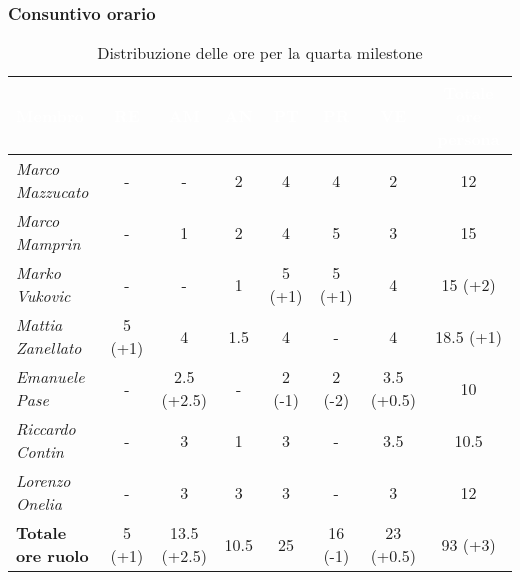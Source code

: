 \subsubsection{Consuntivo orario}
\begin{table}[H]
    \renewcommand\arraystretch{1.5}
    \small
    \centering
    \begin{adjustwidth}{-1.15cm}{}
    \begin{tabular}{|l|c|c|c|c|c|c|c|}
    \hline
    \rowcolor[HTML]{036400}
    \textcolor{white}{\textbf{Membro}} & \multicolumn{1}{c|}{\textcolor{white}{\textbf{RE}}} & \multicolumn{1}{c|}{\textcolor{white}{\textbf{AM}}} & \multicolumn{1}{c|}{\textcolor{white}{\textbf{AN}}} & \multicolumn{1}{c|}{\textcolor{white}{\textbf{PT}}} & \multicolumn{1}{c|}{\textcolor{white}{\textbf{PR}}} & \multicolumn{1}{c|}{\textcolor{white}{\textbf{VE}}} & \multicolumn{1}{c|}{\textcolor{white}{\textbf{Totale ore persona}}} \\ \hline
    \rowcolor[HTML]{EFEFEF}\textit{Marco Mazzucato}  & -       & -           & 2           & 4           & 4       & 2            & 12           \\ \hline
    \rowcolor[HTML]{C0C0C0}\textit{Marco Mamprin}    & -       & 1           & 2           & 4           & 5       & 3            & 15           \\ \hline
    \rowcolor[HTML]{EFEFEF}\textit{Marko Vukovic}    & -       & -           & 1           & 5 (+1)      & 5 (+1)  & 4            & 15 (+2)      \\ \hline
    \rowcolor[HTML]{C0C0C0}\textit{Mattia Zanellato} & 5 (+1)  & 4           & 1.5         & 4           & -       & 4            & 18.5 (+1)    \\ \hline
    \rowcolor[HTML]{EFEFEF}\textit{Emanuele Pase}    & -       & 2.5 (+2.5)  & -           & 2 (-1)      & 2 (-2)  & 3.5 (+0.5)   & 10           \\ \hline
    \rowcolor[HTML]{C0C0C0}\textit{Riccardo Contin}  & -       & 3           & 1           & 3           & -       & 3.5          & 10.5         \\ \hline
    \rowcolor[HTML]{EFEFEF}\textit{Lorenzo Onelia}   & -       & 3           & 3           & 3           & -       & 3            & 12           \\ \hline
    \rowcolor[HTML]{C0C0C0}\textbf{Totale ore ruolo} & 5 (+1)  & 13.5 (+2.5) & 10.5        & 25          & 16 (-1) & 23 (+0.5)    & 93 (+3)      \\ \hline
    \end{tabular}
    \end{adjustwidth}
  \caption{Distribuzione delle ore per la quarta milestone}
\end{table}

